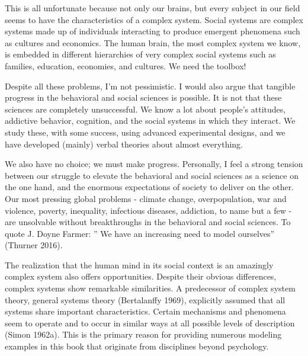 \documentclass[
  a4paper,
  DIV=11,
  numbers=noendperiod,
  oneside]{scrreprt}
\begin{document}
This is all unfortunate because not only our brains, but every subject
in our field seems to have the characteristics of a complex system.
Social systems are complex systems made up of individuals interacting to
produce emergent phenomena such as cultures and economics. The human
brain, the most complex system we know, is embedded in different
hierarchies of very complex social systems such as families, education,
economies, and cultures. We need the toolbox!

Despite all these problems, I'm not pessimistic. I would also argue that
tangible progress in the behavioral and social sciences is possible. It
is not that these sciences are completely unsuccessful. We know a lot
about people's attitudes, addictive behavior, cognition, and the social
systems in which they interact. We study these, with some success, using
advanced experimental designs, and we have developed (mainly) verbal
theories about almost everything.

We also have no choice; we must make progress. Personally, I feel a
strong tension between our struggle to elevate the behavioral and social
sciences as a science on the one hand, and the enormous expectations of
society to deliver on the other. Our most pressing global problems -
climate change, overpopulation, war and violence, poverty, inequality,
infectious diseases, addiction, to name but a few - are unsolvable
without breakthroughs in the behavioral and social sciences. To quote J.
Doyne Farmer: '' We have an increasing need to model ourselves''
(Thurner 2016).

The realization that the human mind in its social context is an
amazingly complex system also offers opportunities. Despite their
obvious differences, complex systems show remarkable similarities. A
predecessor of complex system theory, general systems theory
(Bertalanffy 1969), explicitly assumed that all systems share important
characteristics. Certain mechanisms and phenomena seem to operate and to
occur in similar ways at all possible levels of description (Simon
1962a). This is the primary reason for providing numerous modeling
examples in this book that originate from disciplines beyond psychology.
\end{document}
